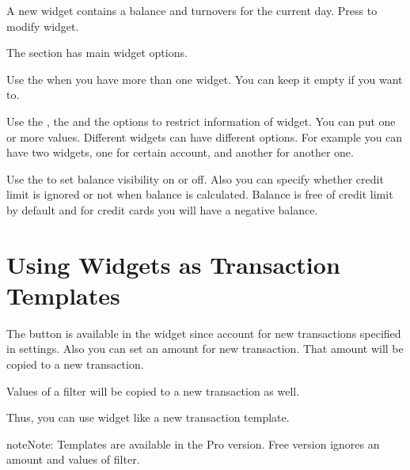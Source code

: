 \documentclass[a4paper,10pt,english]{sphinxmanual}
\begin{document}
\noindent{}
\noindent{}
\noindent{}

\sphinxAtStartPar
A new widget contains a balance and turnovers for the current day. Press 
to modify widget.

\sphinxAtStartPar
The  section has main widget options.

\sphinxAtStartPar
Use the  when you have more than one widget. You can keep it empty if you want to.

\sphinxAtStartPar
Use the , the  and the  options
to restrict information of widget. You can put one or more values. Different widgets
can have different options. For example you can have two widgets, one for
certain account, and another for another one.

\sphinxAtStartPar
Use the  to set balance visibility on or off. Also you can specify
whether credit limit is ignored or not when balance is calculated.
Balance is free of credit limit by default and for credit cards
you will have a negative balance.

\noindent{}
\noindent{}


\section{Using Widgets as Transaction Templates}
\label{\detokenize{widgets:using-widgets-as-transaction-templates}}
\sphinxAtStartPar
The  button is available in the widget since account for new transactions specified in
settings. Also you can set an amount for new transaction. That amount will be copied to a new transaction.

\sphinxAtStartPar
Values of a filter will be copied to a new transaction as well.

\sphinxAtStartPar
Thus, you can use widget like a new transaction template.

\begin{sphinxadmonition}{note}{Note:}
\sphinxAtStartPar
Templates are available in the Pro version. Free version ignores an amount and values of filter.
\end{sphinxadmonition}
\end{document}
